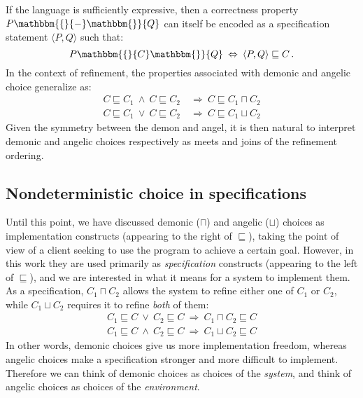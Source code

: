 \documentclass[draft,11pt]{report}
\theoremstyle{definition}
\newcommand{\htr}[3]{{ {#1} \mathbbm{\{} {#2} \mathbbm{\}} {#3} }}
\begin{document}
If the language is sufficiently expressive,
then a correctness property $\htr{P}{-}{Q}$
can itself be encoded \citep{specstm} as
a specification statement $\langle{}P,Q{}\rangle$
such that:
\[
    \htr{P}{C}{Q} \: \Leftrightarrow \:
    \langle{}P,Q{}\rangle \sqsubseteq C \,.
\]
In the context of refinement,
the properties associated with demonic and angelic choice
generalize as:
\begin{align*}
  C \sqsubseteq C_1 \:\wedge\: C \sqsubseteq C_2 &
    \:\Rightarrow\: C \sqsubseteq C_1 \sqcap C_2 \\
  C \sqsubseteq C_1 \:\vee\: C \sqsubseteq C_2 &
    \:\Rightarrow\: C \sqsubseteq C_1 \sqcup C_2
\end{align*}
Given the symmetry between the demon and angel,
it is then natural to interpret demonic and angelic choices
respectively as meets and joins
of the refinement ordering.

\subsection{Nondeterministic choice in specifications}

Until this point,
we have discussed demonic ($\sqcap$) and angelic ($\sqcup$) choices
as implementation constructs
(appearing to the right of $\sqsubseteq$),
taking the point of view of a client
seeking to use the program to achieve a certain goal.
However,
in this work they are used primarily
as \emph{specification} constructs
(appearing to the left of $\sqsubseteq$),
and we are interested in what it means
for a system to implement them.
%
As a specification, $C_1 \sqcap C_2$
allows the system to refine either one of $C_1$ or $C_2$, while
$C_1 \sqcup C_2$ requires it to refine
\emph{both} of them:
\begin{gather*}
  C_1 \sqsubseteq C \: \vee \: C_2 \sqsubseteq C
    \: \Rightarrow \: C_1 \sqcap C_2 \sqsubseteq C \\
  C_1 \sqsubseteq C \: \wedge \: C_2 \sqsubseteq C
    \: \Rightarrow \: C_1 \sqcup C_2 \sqsubseteq C 
\end{gather*}
In other words,
demonic choices
give us more
implementation freedom,
whereas angelic choices make a specification
stronger and more difficult to implement.
Therefore we can think of demonic choices as
choices of the \emph{system}, %
and think of angelic choices as
choices of the \emph{environment}.
\end{document}
